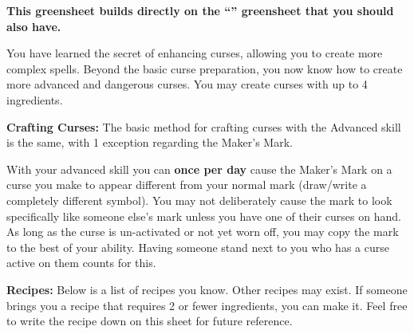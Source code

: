 \documentclass[green]{GL2020}
\begin{document}
\name{\gCursemakingAdvanced{}}

\textbf{This greensheet builds directly on the ``\gCursemakingBasic{}'' greensheet that you should also have.}

You have learned the secret of enhancing curses, allowing you to create more complex spells. Beyond the basic curse preparation, you now know how to create more advanced and dangerous curses. You may create curses with up to 4 ingredients.


\textbf{Crafting Curses:}
The basic method for crafting curses with the Advanced skill is the same, with 1 exception regarding the Maker’s Mark.

With your advanced skill you can \textbf{once per day} cause the Maker’s Mark on a curse you make to appear different from your normal mark (draw/write a completely different symbol). You may not deliberately cause the mark to look specifically like someone else’s mark unless you have one of their curses on hand. As long as the curse is un-activated or not yet worn off, you may copy the mark to the best of your ability. Having someone stand next to you who has a curse active on them counts for this.

\textbf{Recipes:}
Below is a list of recipes you know. Other recipes may exist. If someone brings you a recipe that requires 2 or fewer ingredients, you can make it. Feel free to write the recipe down on this sheet for future reference.
\end{document}
